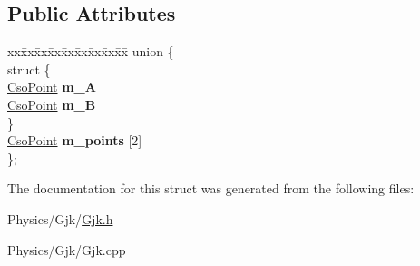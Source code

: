 \subsection*{Public Attributes}
\begin{DoxyCompactItemize}
\item 
\mbox{\label{structGjk_1_1CsoEdge_a5e14c47961fc0f7e6a7fa03a2e997f40}} 
\begin{tabbing}
xx\=xx\=xx\=xx\=xx\=xx\=xx\=xx\=xx\=\kill
union \{\\
\mbox{\label{unionGjk_1_1CsoEdge_1_1_0D18_a2ffa204621e9cb8c41b2be55e2974af0}} 
\>struct \{\\
\>\>\hyperlink{structGjk_1_1CsoPoint}{CsoPoint} {\bfseries m\_A}\\
\>\>\hyperlink{structGjk_1_1CsoPoint}{CsoPoint} {\bfseries m\_B}\\
\>\} \\
\>\hyperlink{structGjk_1_1CsoPoint}{CsoPoint} {\bfseries m\_points} \mbox{[}2\mbox{]}\\
\}; \\

\end{tabbing}\end{DoxyCompactItemize}


The documentation for this struct was generated from the following files\+:\begin{DoxyCompactItemize}
\item 
Physics/\+Gjk/\hyperlink{Gjk_8h}{Gjk.\+h}\item 
Physics/\+Gjk/Gjk.\+cpp\end{DoxyCompactItemize}
